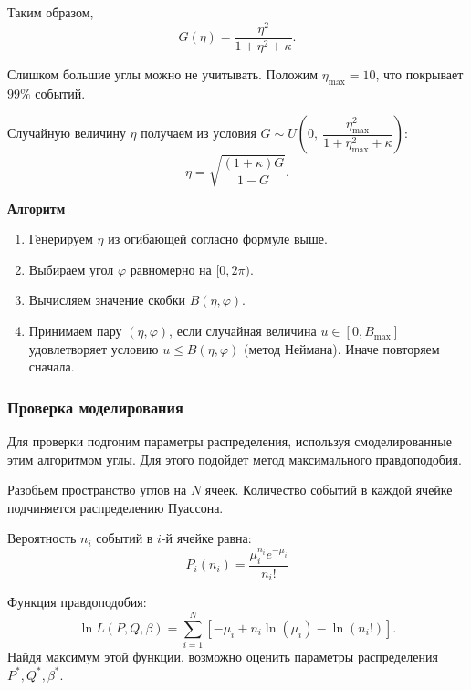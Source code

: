 \documentclass[12pt,a4paper]{article}
\begin{document}
Таким образом,
\begin{equation}
G(\eta) = \frac{\eta^2}{1 + \eta^2 + \kappa}.
\end{equation}

Слишком большие углы можно не учитывать. Положим $\eta_{\text{max}} = 10$, что покрывает $99\%$ событий.

Случайную величину $\eta$ получаем из условия $G \sim U\!\left(0,\ \dfrac{\eta_{\text{max}}^2}{1+\eta_{\text{max}}^2+\kappa}\right)$:
\begin{equation}
\eta = \sqrt{\frac{(1+\kappa)G}{1-G}}.
\end{equation}

\textbf{Алгоритм}
\begin{enumerate}
    \item Генерируем $\eta$ из огибающей согласно формуле выше.
    \item Выбираем угол $\varphi$ равномерно на $[0, 2\pi)$.
    \item Вычисляем значение скобки $B(\eta,\varphi)$.
    \item Принимаем пару $(\eta,\varphi)$, если случайная величина 
          $u \in [0, B_{\text{max}}]$ удовлетворяет условию $u \le B(\eta,\varphi)$ 
          (метод Неймана). Иначе повторяем сначала.
\end{enumerate}


\subsubsection{Проверка моделирования}


Для проверки подгоним параметры распределения, используя смоделированные этим алгоритмом углы. Для этого подойдет метод максимального правдоподобия.

Разобьем пространство углов на $N$ ячеек. Количество событий в каждой ячейке подчиняется распределению Пуассона.

Вероятность $n_i$ событий в $i$-й ячейке равна:
\begin{equation}
P_i(n_i) = \dfrac{\mu_i^{n_i}e^{-\mu_i}}{n_i!}
\end{equation}

Функция правдоподобия:
\begin{equation}
\ln L\left(P,Q,\beta \right) = \sum_{i=1}^N \left[-\mu_i + n_i \ln(\mu_i) - \ln(n_i!) \right].
\end{equation}
Найдя максимум этой функции, возможно оценить параметры распределения $P^*, Q^*, \beta^*$.
\end{document}

